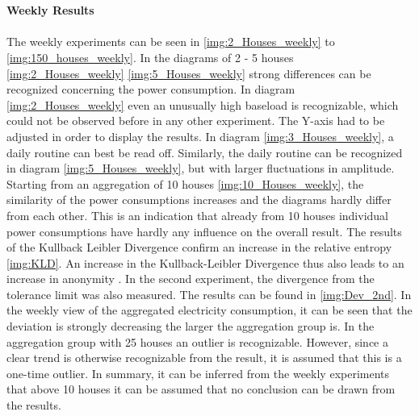 \\
\\
\textbf{Weekly Results}
\\
\\
The weekly experiments can be seen in \ref{img:2_Houses_weekly} to \ref{img:150_houses_weekly}. In the diagrams of 2 - 5 houses \ref{img:2_Houses_weekly} \ref{img:5_Houses_weekly} strong differences can be recognized concerning the power consumption.
In diagram \ref{img:2_Houses_weekly} even an unusually high baseload is recognizable, which could not be observed before in any other experiment. The Y-axis had to be adjusted in order to display the results. In diagram \ref{img:3_Houses_weekly}, a daily routine can best be read off. Similarly, the daily routine can be recognized in diagram \ref{img:5_Houses_weekly}, but with larger fluctuations in amplitude. Starting from an aggregation of 10 houses \ref{img:10_Houses_weekly}, the similarity of the power consumptions increases and the diagrams hardly differ from each other. This is an indication that already from 10 houses individual power consumptions have hardly any influence on the overall result. The results of the Kullback Leibler Divergence confirm an increase in the relative entropy \ref{img:KLD}. An increase in the Kullback-Leibler Divergence thus also leads to an increase in anonymity \cite{kalogridis2010privacy}.
In the second experiment, the divergence from the tolerance limit was also measured. The results can be found in \ref{img:Dev_2nd}. In the weekly view of the aggregated electricity consumption, it can be seen that the deviation is strongly decreasing the larger the aggregation group is. In the aggregation group with 25 houses an outlier is recognizable. However, since a clear trend is otherwise recognizable from the result, it is assumed that this is a one-time outlier. In summary, it can be inferred from the weekly experiments that above 10 houses it can be assumed that no conclusion can be drawn from the results.

